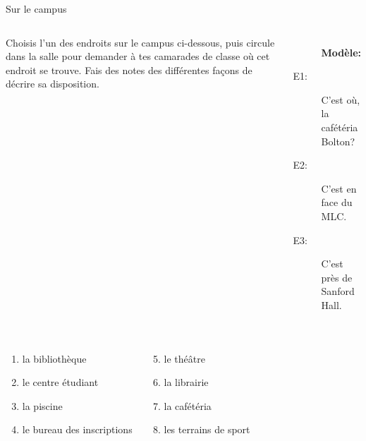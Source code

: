 \begin{frame}{Sur le campus}
  \begin{columns}
      Choisis l'un des endroits sur le campus ci-dessous, puis circule dans la salle pour demander à tes camarades de classe où cet endroit se trouve.
      Fais des notes des différentes façons de décrire sa disposition. \\
      {\small
      \begin{description}
        \item[] \textbf{Modèle:}
        \item[E1:] C'est où, la cafétéria Bolton?
        \item[E2:] C'est en face du MLC.
        \item[E3:] C'est près de Sanford Hall.
      \end{description}
      }
  \end{columns}
  \vspace{0.25cm}
  \begin{columns}
      \begin{enumerate}
        \item la bibliothèque
        \item le centre étudiant
        \item la piscine
        \item le bureau des inscriptions
      \end{enumerate}
      \begin{enumerate}
        \setcounter{enumi}{4}
        \item le théâtre
        \item la librairie
        \item la cafétéria
        \item les terrains de sport
      \end{enumerate}
  \end{columns}
\end{frame}